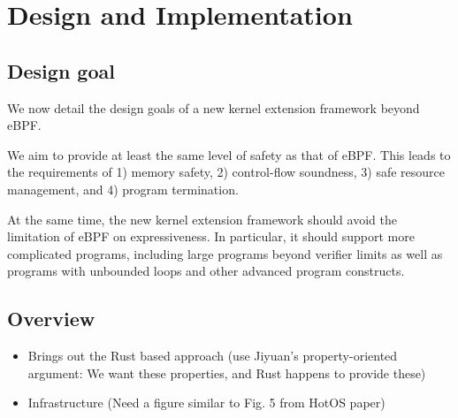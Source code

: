\section{Design and Implementation}

\subsection{Design goal}


We now detail the design goals of a new kernel extension framework beyond eBPF.

 We aim to provide at least the same level of safety as that of
  eBPF.
This leads to the requirements of 1) memory safety, 2) control-flow soundness,
3) safe resource management, and 4) program termination.

 At the same time, the new kernel extension framework
  should avoid the limitation of eBPF on expressiveness.
In particular, it should support more complicated programs, including large
  programs beyond verifier limits as well as programs with unbounded loops
  and other advanced program constructs.

\subsection{Overview}
\begin{itemize}
    \item Brings out the Rust based approach (use Jiyuan's property-oriented
        argument: We want these properties, and Rust happens to provide these)
    \item Infrastructure (Need a figure similar to Fig. 5 from HotOS paper)
\end{itemize}

